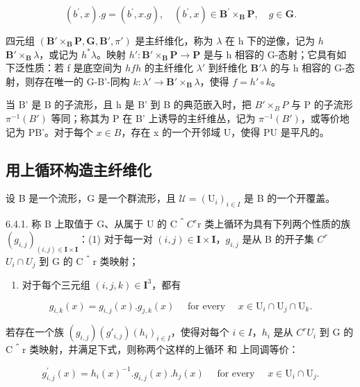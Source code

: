 \[
(b ^ {\prime}, x). g = (b ^ {\prime}, x. g), \quad (b ^ {\prime}, x) \in \mathbf {B} ^ {\prime} \times_ {\mathbf {B}} \mathbf {P}, \quad g \in \mathbf {G}.
\]

四元组 \((\mathbf{B}' \times_{\mathbf{B}} \mathbf{P}, \mathbf{G}, \mathbf{B}', \pi')\) 是主纤维化，称为 \(\lambda\) 在 h 下的逆像，记为 \(h\)\(\mathbf{B}' \times_{\mathbf{B}} \lambda\)，或记为 \(h^*\lambda\)。映射 \(h': \mathbf{B}' \times_{\mathbf{B}} \mathbf{P} \to \mathbf{P}\) 是与 h 相容的 G-态射；它具有如下泛性质：若 f 是底空间为 \(h\)\(f\)\(h\) 的主纤维化 \(\lambda'\) 到纤维化 \(\mathbf{B}'\)\(\lambda\) 的与 h 相容的 G-态射，则存在唯一的 G-B'-同构 \(k: \lambda' \to \mathbf{B}' \times_{\mathbf{B}} \lambda\)，使得 \(f = h' \circ k\)。

当 B' 是 B 的子流形，且 h 是 B' 到 B 的典范嵌入时，把 \(B' \times_{B} P\) 与 P 的子流形 \(\pi^{-1}(B')\) 等同；称其为 P 在 B' 上诱导的主纤维丛，记为 \(\pi^{-1}(B')\)，或等价地记为 P\textbar B'。对于每个 \(x \in B\)，存在 x 的一个开邻域 U，使得 P\textbar U 是平凡的。

\subsection{用上循环构造主纤维化}

设 B 是一个流形，G 是一个群流形，且 \(\mathcal{U} = (\mathrm{U}_{i})_{i\in I}\) 是 B 的一个开覆盖。

6.4.1. 称 B 上取值于 G、从属于 U 的 C＾\(C^{r}\)r 类上循环为具有下列两个性质的族 \((g_{i,j})_{(i,j)\in\mathbf{I}\times\mathbf{I}}\)：(1) 对于每一对 \((i,j)\in\mathbf{I}\times\mathbf{I}\)，\(g_{i,j}\) 是从 B 的开子集 \(C^{r}\)\(U_{i}\cap U_{j}\) 到 G 的 C＾r 类映射；

\begin{enumerate}
\def\labelenumi{(\arabic{enumi})}
\setcounter{enumi}{1}
\tightlist
\item
  对于每个三元组 \((i,j,k)\in \mathbf{I}^3\)，都有
\end{enumerate}

\[
g _ {i, k} (x) = g _ {i, j} (x). g _ {j, k} (x) \quad \text { for   every } \quad x \in \mathrm{U} _ {i} \cap \mathrm{U} _ {j} \cap \mathrm{U} _ {k}.
\]

若存在一个族 \((g_{i,j})\)\((g'_{i,j})\)\((h_{i})_{i\in I}\)，使得对每个 \(i\in I\)，\(h_{i}\) 是从 \(C^{r}\)\(U_{i}\) 到 G 的 C＾r 类映射，并满足下式，则称两个这样的上循环  和  上同调等价：

\[
g _ {i, j} ^ {\prime} (x) = h _ {i} (x) ^ {- 1}. g _ {i, j} (x). h _ {j} (x) \quad \text { for   every } \quad x \in \mathrm{U} _ {i} \cap \mathrm{U} _ {j}.\tag{3}
\]

